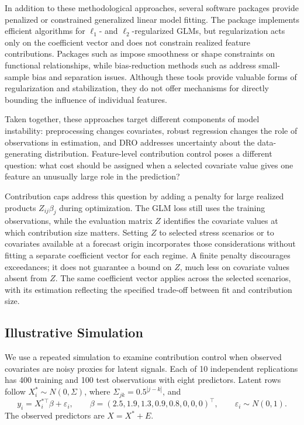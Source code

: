 \documentclass[article,shortnames,nofooter]{jss}
\begin{document}
In addition to these methodological approaches, several software packages provide penalized or constrained generalized linear model fitting. The  package \citep{friedman2010} implements efficient algorithms for $\ell_1$- and $\ell_2$-regularized GLMs, but regularization acts only on the coefficient vector and does not constrain realized feature contributions. Packages such as  \citep{wood2017} impose smoothness or shape constraints on functional relationships, while bias-reduction methods such as  \citep{kosmidis2019} address small-sample bias and separation issues. Although these tools provide valuable forms of regularization and stabilization, they do not offer mechanisms for directly bounding the influence of individual features.

Taken together, these approaches target different components of model instability: preprocessing changes covariates, robust regression changes the role of observations in estimation, and DRO addresses uncertainty about the data-generating distribution. Feature-level contribution control poses a different question: what cost should be assigned when a selected covariate value gives one feature an unusually large role in the prediction?

Contribution caps address this question by adding a penalty for large realized products $Z_{ij}\beta_j$ during optimization. The GLM loss still uses the training observations, while the evaluation matrix $Z$ identifies the covariate values at which contribution size matters. Setting $Z$ to selected stress scenarios or to covariates available at a forecast origin incorporates those considerations without fitting a separate coefficient vector for each regime. A finite penalty discourages exceedances; it does not guarantee a bound on $Z$, much less on covariate values absent from $Z$. The same coefficient vector applies across the selected scenarios, with its estimation reflecting the specified trade-off between fit and contribution size.

\subsection{Illustrative Simulation}

We use a repeated simulation to examine contribution control when observed covariates are noisy proxies for latent signals. Each of 10 independent replications has 400 training and 100 test observations with eight predictors. Latent rows follow $X_i^*\sim N(0,\Sigma)$, where $\Sigma_{jk}=0.5^{|j-k|}$, and
\[
y_i=X_i^{*\top}\beta+\varepsilon_i,\qquad
\beta=(2.5,1.9,1.3,0.9,0.8,0,0,0)^\top,\qquad
\varepsilon_i\sim N(0,1).
\]
The observed predictors are $X=X^*+E$.
\end{document}
